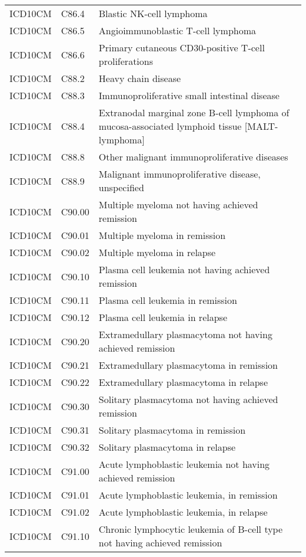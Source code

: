\begin{longtable}{p{}p{}p{}}
  ICD10CM & C86.4 & Blastic NK-cell lymphoma \\ 
  ICD10CM & C86.5 & Angioimmunoblastic T-cell lymphoma \\ 
  ICD10CM & C86.6 & Primary cutaneous CD30-positive T-cell proliferations \\ 
  ICD10CM & C88.2 & Heavy chain disease \\ 
  ICD10CM & C88.3 & Immunoproliferative small intestinal disease \\ 
  ICD10CM & C88.4 & Extranodal marginal zone B-cell lymphoma of mucosa-associated lymphoid tissue [MALT-lymphoma] \\ 
  ICD10CM & C88.8 & Other malignant immunoproliferative diseases \\ 
  ICD10CM & C88.9 & Malignant immunoproliferative disease, unspecified \\ 
  ICD10CM & C90.00 & Multiple myeloma not having achieved remission \\ 
  ICD10CM & C90.01 & Multiple myeloma in remission \\ 
  ICD10CM & C90.02 & Multiple myeloma in relapse \\ 
  ICD10CM & C90.10 & Plasma cell leukemia not having achieved remission \\ 
  ICD10CM & C90.11 & Plasma cell leukemia in remission \\ 
  ICD10CM & C90.12 & Plasma cell leukemia in relapse \\ 
  ICD10CM & C90.20 & Extramedullary plasmacytoma not having achieved remission \\ 
  ICD10CM & C90.21 & Extramedullary plasmacytoma in remission \\ 
  ICD10CM & C90.22 & Extramedullary plasmacytoma in relapse \\ 
  ICD10CM & C90.30 & Solitary plasmacytoma not having achieved remission \\ 
  ICD10CM & C90.31 & Solitary plasmacytoma in remission \\ 
  ICD10CM & C90.32 & Solitary plasmacytoma in relapse \\ 
  ICD10CM & C91.00 & Acute lymphoblastic leukemia not having achieved remission \\ 
  ICD10CM & C91.01 & Acute lymphoblastic leukemia, in remission \\ 
  ICD10CM & C91.02 & Acute lymphoblastic leukemia, in relapse \\ 
  ICD10CM & C91.10 & Chronic lymphocytic leukemia of B-cell type not having achieved remission \\ 

\end{longtable}
